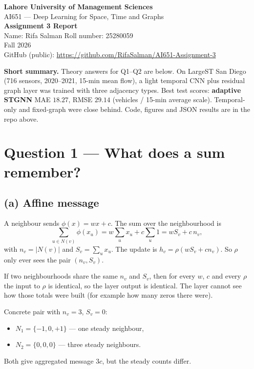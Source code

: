 \documentclass[11pt,a4paper]{article}
\begin{document}
\begin{center}
{\Large\bfseries Lahore University of Management Sciences}\\[0.35em]
{\large AI651 --- Deep Learning for Space, Time and Graphs}\\[0.25em]
{\Large\bfseries Assignment 3 Report}\\[0.55em]
Name: Rifa Salman \quad Roll number: 25280059\\[0.15em]
Fall 2026\\[0.15em]
GitHub (public): \url{https://github.com/RifaSalman/AI651-Assignment-3}
\end{center}

\vspace{0.4em}
\noindent\textbf{Short summary.}
Theory answers for Q1--Q2 are below. On LargeST San Diego (716 sensors, 2020--2021, 15-min mean flow), a light temporal CNN plus residual graph layer was trained with three adjacency types. Best test scores: \textbf{adaptive STGNN} MAE $18.27$, RMSE $29.14$ (vehicles / 15-min average scale). Temporal-only and fixed-graph were close behind. Code, figures and JSON results are in the repo above.

\section*{Question 1 --- What does a sum remember?}

\subsection*{(a) Affine message}
A neighbour sends $\phi(x)=wx+c$. The sum over the neighbourhood is
\[
\sum_{u\in N(v)}\phi(x_u)=w\sum_{u}x_u+c\sum_{u}1=wS_v+c\,n_v,
\]
with $n_v=|N(v)|$ and $S_v=\sum_u x_u$. The update is $h_v=\rho(wS_v+cn_v)$. So $\rho$ only ever sees the pair $(n_v,S_v)$.

If two neighbourhoods share the same $n_v$ and $S_v$, then for every $w$, $c$ and every $\rho$ the input to $\rho$ is identical, so the layer output is identical. The layer cannot see how those totals were built (for example how many zeros there were).

Concrete pair with $n_v=3$, $S_v=0$:
\begin{itemize}
\item $N_1=\{-1,0,+1\}$ --- one steady neighbour,
\item $N_2=\{0,0,0\}$ --- three steady neighbours.
\end{itemize}
Both give aggregated message $3c$, but the steady counts differ.
\end{document}
